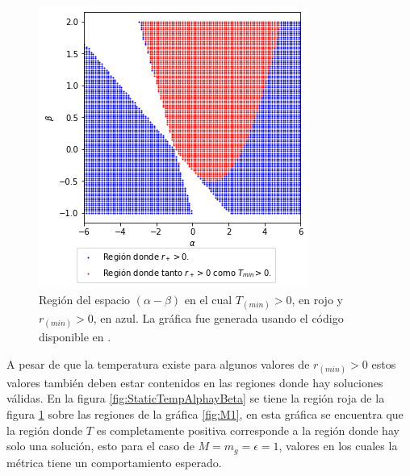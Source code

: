 \begin{figure}[H]
    \centering
    \includegraphics[scale = 0.5]{SoluciónEstática/Termodinámica/Temperatura.png}
    \caption{Región del espacio $(\alpha-\beta)$ en el cual $T_{(min)}>0$, en rojo y $r_{(min)}>0$, en azul. La gráfica fue generada usando el código disponible en \cite{GitHub}.}
    \label{fig:TemperaturaStatic}
\end{figure}

A pesar de que la temperatura existe para algunos valores de $r_{(min)}>0$ estos valores también deben estar contenidos en las regiones donde hay soluciones válidas. En la figura \ref{fig:StaticTempAlphayBeta} se tiene la región roja de la figura \ref{fig:TemperaturaStatic} sobre las regiones de la gráfica \ref{fig:M1}, en esta gráfica se encuentra que la región donde $T$ es completamente positiva corresponde a la región donde hay solo una solución, esto para el caso de $M=m_g=\epsilon=1$, valores en los cuales la métrica tiene un comportamiento esperado.

